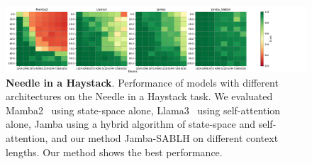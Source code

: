 \documentclass{article}
\theoremstyle{plain}
\theoremstyle{definition}
\theoremstyle{remark}
\begin{document}
\begin{figure}[ht]
   \centering
   \includegraphics[width=\linewidth]{fig/needle-in-a-haystack.pdf}
   \caption{
     \textbf{Needle in a Haystack}.
      Performance of models with different architectures on the Needle in a Haystack task. We evaluated Mamba2~\cite{mamba2} using state-space alone, Llama3~\cite{grattafiori2024llama3herdmodels} using self-attention alone, Jamba using a hybrid algorithm of state-space and self-attention, and our method Jamba-SABLH on different context lengths. Our method shows the best performance.
      }
   \label{fig:niah}
\end{figure}
\end{document}

